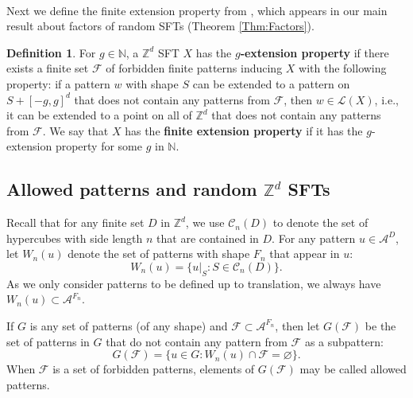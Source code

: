 \documentclass[12pt]{amsart}
\theoremstyle{definition}
\newtheorem{definition}[theorem]{Definition}
\begin{document}
\


Next we define the finite extension property from \cite{McGoffPavlov_factors}, which appears in our main result about factors of random SFTs (Theorem \ref{Thm:Factors}).

\begin{definition}\label{extprop}
For $g \in \mathbb{N}$, a $\mathbb{Z}^d$ SFT $X$ has the \textbf{$g$-extension property} if there exists a finite set $\mathcal{F}$ of forbidden finite patterns inducing $X$ with the following property: if a pattern $w$ with shape $S$ can be extended to a pattern on $S + [-g,g]^d$ that does not contain any patterns from $\mathcal{F}$, then $w \in \mathcal{L}(X)$, i.e., it can be extended to a point on all of $\mathbb{Z}^d$ that does not contain any patterns from $\mathcal{F}$. We say that $X$ has the \textbf{finite extension property} if it has the $g$-extension property for some $g$ in $\mathbb{N}$.
\end{definition}

\subsection{Allowed patterns and random $\mathbb{Z}^d$ SFTs}

Recall that for any finite set $D$ in $\mathbb{Z}^d$, we use $\mathcal{C}_n(D)$ to denote the set of hypercubes with side length $n$ that are contained in $D$. For any pattern $u \in \mathcal{A}^D$, let $W_n(u)$ denote the set of patterns with shape $F_n$ that appear in $u$:
\begin{equation*}
W_n(u) = \bigl\{ u|_S : S \in \mathcal{C}_n(D) \bigr\}.
\end{equation*}
As we only consider patterns to be defined up to translation, we always have $W_n(u) \subset \mathcal{A}^{F_n}$.

If $G$ is any set of patterns (of any shape) and $\mathcal{F} \subset \mathcal{A}^{F_n}$, then let $G(\mathcal{F})$ be the set of patterns in $G$ that do not contain any pattern from $\mathcal{F}$ as a subpattern:
\begin{equation*}
G(\mathcal{F}) = \bigl\{ u \in G : W_n(u) \cap \mathcal{F} = \varnothing \bigr\}.
\end{equation*}
When $\mathcal{F}$ is a set of forbidden patterns, elements of $G(\mathcal{F})$ may be called allowed patterns.

\
\end{document}
